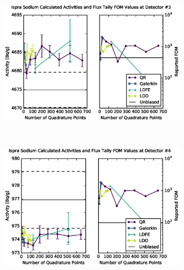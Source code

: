 \begin{figure}[!htb]
\ContinuedFloat
\begin{subfigure}{\linewidth}
\centering
\includegraphics[max height=0.445\textheight]
{img/eurac-plots/mcnp/fwc-34.eps}
\label{eurac-34}
\end{subfigure}
\\
\begin{subfigure}{\linewidth}
\centering
\includegraphics[max height=0.445\textheight]
{img/eurac-plots/mcnp/fwc-44.eps}
\label{eurac-44}
\end{subfigure}
\end{figure}
\clearpage
